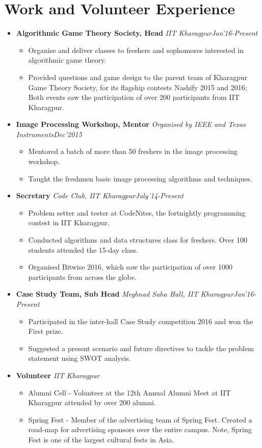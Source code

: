 \documentclass[11pt,a4paper]{moderncv}
\newcommand{\experience}[4]{
  \vspace{0.1cm}
\item \textbf{\large{#1}} \textit{#2}\hfill\textit{#3}
  \begin{itemize}[leftmargin=*]
    \setlength\itemsep{0em} #4
  \end{itemize}
}
\begin{document}
\section*{Work and Volunteer Experience}
\begin{itemize}
  \setlength\itemsep{0.5em}

  \experience{Algorithmic Game Theory Society, Head}{IIT Kharagpur}{Jan'16-Present}{
  \item	Organise and deliver classes to freshers and sophomores interested in algorithmic game theory. 
  \item	Provided questions and game design to the parent team of Kharagpur Game Theory Society, for its flagship contests Nashify 2015 and 2016; Both events saw the participation of over 200 participants from IIT Kharagpur.
  }
    
  \experience{Image Processing Workshop, Mentor}{Organised by IEEE and Texas Instruments}{Dec'2015}{
  \item Mentored a batch of more than 50 freshers in the image processing workshop.
  \item Taught the freshmen basic image processing algorithms and techniques.
  }

  \experience{Secretary}{Code Club, IIT Kharagpur}{July'14-Present}{
  \item	Problem setter and tester at CodeNites, the fortnightly programming contest in IIT Kharagpur.
  \item	Conducted algorithms and data structures class for freshers. Over 100 students attended the 15-day class.
  \item Organised Bitwise 2016, which saw the participation of over 1000 participants from across the globe.
  }

  \experience{Case Study Team, Sub Head}{Meghnad Saha Hall, IIT Kharagpur}{Jan'16-Present}{
  \item Participated in the inter-hall Case Study competition 2016 and won the First prize.
  \item Suggested a present scenario and future directives to tackle the problem statement using SWOT analysis.
  }

  \experience{Volunteer}{IIT Kharagpur}{}{
  \item Alumni Cell - Volunteer at the 12th Annual Alumni Meet at IIT Kharagpur attended by over 200 alumni.
  \item Spring Fest - Member of the advertising team of Spring Fest. Created a road-map for advertising sponsors over the entire campus. Note, Spring Fest is one of the largest cultural fests in Asia.


  }

\end{itemize}
\end{document}
